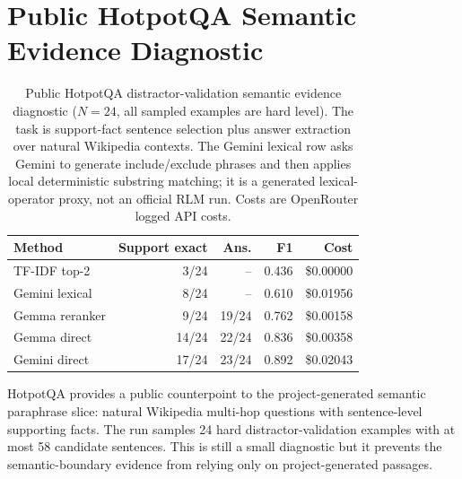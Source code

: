 \documentclass[letterpaper]{article}
\begin{document}
\section{Public HotpotQA Semantic Evidence Diagnostic}

\begin{table}[t]
\centering
\small
\setlength{\tabcolsep}{4pt}
\begin{tabular}{@{}lrrrr@{}}
\toprule
\textbf{Method} & \textbf{Support exact} & \textbf{Ans.} & \textbf{F1} & \textbf{Cost} \\
\midrule
TF-IDF top-2 & 3/24 & -- & 0.436 & \$0.00000 \\
Gemini lexical & 8/24 & -- & 0.610 & \$0.01956 \\
Gemma reranker & 9/24 & 19/24 & 0.762 & \$0.00158 \\
Gemma direct & 14/24 & 22/24 & 0.836 & \$0.00358 \\
Gemini direct & 17/24 & 23/24 & 0.892 & \$0.02043 \\
\bottomrule
\end{tabular}
\caption{Public HotpotQA distractor-validation semantic evidence diagnostic ($N=24$, all sampled examples are hard level). The task is support-fact sentence selection plus answer extraction over natural Wikipedia contexts. The Gemini lexical row asks Gemini to generate include/exclude phrases and then applies local deterministic substring matching; it is a generated lexical-operator proxy, not an official RLM run. Costs are OpenRouter logged API costs.}
\label{tab:supp-hotpotqa-semantic}
\end{table}

HotpotQA provides a public counterpoint to the project-generated semantic paraphrase slice: natural Wikipedia multi-hop questions with sentence-level supporting facts. The run samples 24 hard distractor-validation examples with at most 58 candidate sentences. This is still a small diagnostic but it prevents the semantic-boundary evidence from relying only on project-generated passages.
\end{document}
